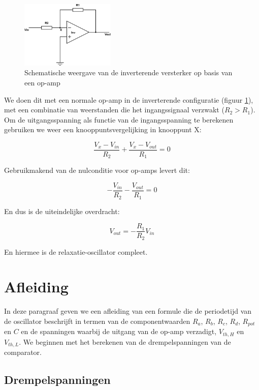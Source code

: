 \documentclass{report}
\begin{document}
\begin{figure}
	\centering
	\includegraphics[width=0.4\textwidth]{inverterende-versterker.png}
	\caption{Schematische weergave van de inverterende versterker op basis van een op-amp}
	\label{fig:inv-ver}
\end{figure}

We doen dit met een normale op-amp in de inverterende configuratie (figuur \ref{fig:inv-ver}), met een combinatie van weerstanden die het ingangssignaal verzwakt ($R_{2}>R_{1}$). Om de uitgangsspanning als functie van de ingangsspanning te berekenen gebruiken we weer een knooppuntsvergelijking in knooppunt X:

$$\frac{V_{x}-V_{in}}{R_{2}} +\frac{V_{x}-V_{out}}{R_{1}} = 0$$

\noindent
Gebruikmakend van de nulconditie voor op-amps levert dit:

$$-\frac{V_{in}}{R_{2}} - \frac{V_{out}}{R_{1}} = 0$$

\noindent
En dus is de uiteindelijke overdracht:

\begin{equation}
	V_{out} = -\frac{R_{1}}{R_{2}}V_{in}
	\label{eq:inv-ver}
\end{equation}

\noindent
En hiermee is de relaxatie-oscillator compleet.

\section{Afleiding}

In deze paragraaf geven we een afleiding van een formule die de periodetijd van de oscillator beschrijft in termen van de componentwaarden $R_{a}$, $R_{b}$, $R_{c}$, $R_{d}$, $R_{pot}$ en $C$ en de spanningen waarbij de uitgang van de op-amp verzadigt, $V_{th,H}$ en $V_{th,L}$. We beginnen met het berekenen van de drempelspanningen van de comparator.

\subsection{Drempelspanningen}
\end{document}
